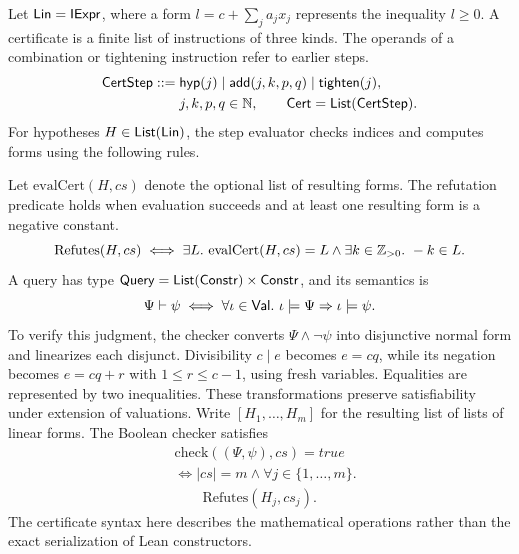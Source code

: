 \begin{definition}\label{def:cert}
Let $\mathsf{Lin}=\mathsf{IExpr}$, where a form $l=c+\sum_j a_jx_j$ represents the inequality $l\ge0$. A certificate is a finite list of instructions of three kinds. The operands of a combination or tightening instruction refer to earlier steps.
\[
\begin{aligned}
\mathsf{CertStep}::={}&\mathsf{hyp}(j)\mid\mathsf{add}(j,k,p,q)\mid\mathsf{tighten}(j),\\
&j,k,p,q\in\mathbb{N},\qquad \mathsf{Cert}=\mathsf{List}(\mathsf{CertStep}).
\end{aligned}
\]
For hypotheses $H\in\mathsf{List}(\mathsf{Lin})$, the step evaluator checks indices and computes forms using the following rules.
Let $\mathrm{evalCert}(H,cs)$ denote the optional list of resulting forms. The refutation predicate holds when evaluation succeeds and at least one resulting form is a negative constant.
\[\mathrm{Refutes}(H,cs)\iff\exists L.\ \mathrm{evalCert}(H,cs)=L\land\exists k\in\Z_{>0}.\ -k\in L.\]
A query has type $\mathsf{Query}=\mathsf{List}(\mathsf{Constr})\times\mathsf{Constr}$, and its semantics is
\[\Psi\ent\psi\iff\forall\iota\in\Ty{Val}.\ \iota\models\Psi\Rightarrow\iota\models\psi.\]
To verify this judgment, the checker converts $\Psi\land\lnot\psi$ into disjunctive normal form and linearizes each disjunct. Divisibility $c\mid e$ becomes $e=cq$, while its negation becomes $e=cq+r$ with $1\le r\le c-1$, using fresh variables. Equalities are represented by two inequalities. These transformations preserve satisfiability under extension of valuations. Write $[H_1,\ldots,H_m]$ for the resulting list of lists of linear forms. The Boolean checker satisfies
\[\begin{aligned}&\mathrm{check}((\Psi,\psi),cs)=\mathit{true}\\ &\iff |cs|=m\land\forall j\in\{1,\ldots,m\}.\\ &\qquad\mathrm{Refutes}(H_j,cs_j).\end{aligned}\]
The certificate syntax here describes the mathematical operations rather than the exact serialization of Lean constructors.
\end{definition}

